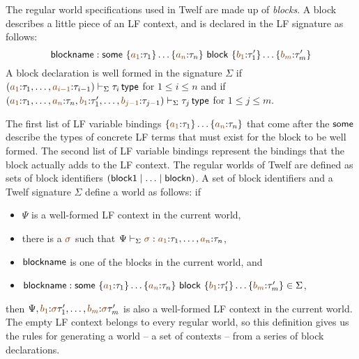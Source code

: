 The regular world specifications used in Twelf are made up of {\it
  blocks}. A block describes a little piece of an LF context, and
is declared in the LF signature as follows:
\[
 {\sf blockname} :
 {\sf some}~\{\lf{a_1}{:}\tau_1\}\ldots\{\lf{a_n}{:}\tau_n\}
~{\sf block}~\{\lf{b_1}{:}\tau'_1\}\ldots\{\lf{b_m}{:}\tau'_m\}
\]
A block declaration is well formed in the signature $\Sigma$ if 
$\left(\lf{a_1}{:}\tau_1,\ldots,\lf{a_{i-1}}{:} \tau_{i-1} \right)\vdash_\Sigma
\tau_i \,{\sf type}$ for $1 \leq i \leq n$ and if 
$\left(\lf{a_1}{:}\tau_1,\ldots,\lf{a_{n}}{:} \tau_{n},
 \lf{b_1}{:}\tau'_1,\ldots,\lf{b_{j-1}}{:}\tau_{j-1}\right) \vdash_\Sigma
\tau_j \,{\sf type}$ for $1 \leq j \leq m$. 

The first list of LF variable bindings
$\{\lf{a_1}{:}\tau_1\}\ldots\{\lf{a_n}{:}\tau_n\}$ that 
come after the ${\sf some}$ describe the types
of concrete LF terms that must exist for the block to be well formed.
The second list of LF variable bindings represent the bindings that
the block actually adds to the LF context. The regular worlds of 
Twelf are defined as sets of block identifiers 
$({\sf block1} \mid \ldots \mid {\sf blockn})$. A set of block identifiers
and a Twelf signature $\Sigma$ define a world as follows: if
\smallskip
\begin{itemize}
\item $\Psi$ is a well-formed
LF context in the current world, 
\item there is a $\lf{\sigma}$ such that
$\Psi \vdash_\Sigma \lf{\sigma} :
\lf{a_1}{:}\tau_1,\ldots,\lf{a_n}{:}\tau_n$, 
\item ${\sf blockname}$ is one of the blocks in the current world, and
\item ${\sf blockname} :
 {\sf some}~\{\lf{a_1}{:}\tau_1\}\ldots\{\lf{a_n}{:}\tau_n\}
~{\sf block}~\{\lf{b_1}{:}\tau'_1\}\ldots\{\lf{b_m}{:}\tau'_m\} \in \Sigma$,
\end{itemize}
\smallskip
then $\Psi,
\lf{b_1}{:}\lf\sigma\tau'_1,\ldots, \lf{b_m}{:}\lf\sigma\tau'_m$ is
also a well-formed LF context in the current world. The empty LF context
belongs to every regular world, so this definition gives us the rules for 
generating a world -- a set of contexts -- from a series of block 
declarations. 

